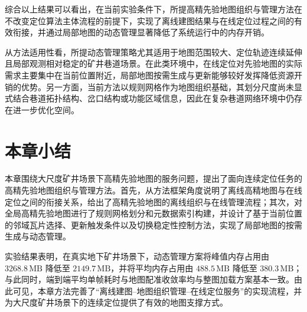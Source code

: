 综合以上结果可以看出，在当前实验条件下，所提高精先验地图组织与管理方法在不改变定位算法主体流程的前提下，实现了离线建图结果与在线定位过程之间的有效衔接，并通过局部地图的动态管理显著降低了系统运行中的内存开销。

从方法适用性看，所提动态管理策略尤其适用于地图范围较大、定位轨迹连续延伸且局部观测相对稳定的矿井巷道场景。在此类环境中，在线定位对先验地图的实际需求主要集中在当前位置附近，局部地图按需生成与更新能够较好发挥降低资源开销的优势。另一方面，当前方法以规则网格作为地图组织基础，其划分尺度尚未显式结合巷道拓扑结构、岔口结构或功能区域信息，因此在复杂巷道网络环境中仍存在进一步优化空间。

\section{本章小结}

本章围绕大尺度矿井场景下高精先验地图的服务问题，提出了面向连续定位任务的高精先验地图组织与管理方法。首先，从方法框架角度说明了离线高精地图与在线定位之间的衔接关系，给出了高精先验地图的离线组织与在线管理流程；其次，对全局高精先验地图进行了规则网格划分和元数据索引构建，并设计了基于当前位置的邻域瓦片选择、更新触发条件以及切换稳定性控制方法，实现了局部地图的按需生成与动态管理。

实验结果表明，在真实地下矿井场景下，动态管理方案将峰值内存占用由 $3268.8\,\mathrm{MB}$ 降低至 $2149.7\,\mathrm{MB}$，并将平均内存占用由 $488.5\,\mathrm{MB}$ 降低至 $380.3\,\mathrm{MB}$；与此同时，端到端平均单帧耗时与地图配准收敛率均与整图加载方案基本一致。由此可见，本章方法完善了“离线建图--地图组织管理--在线定位服务”的实现流程，并为大尺度矿井场景下的连续定位提供了有效的地图支撑方式。

\newpage
